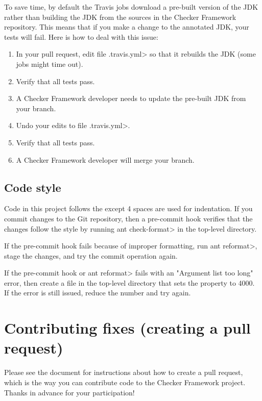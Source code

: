 To save time, by default the Travis jobs download a pre-built version of
the JDK rather than building the JDK from the sources in the Checker
Framework repository.  This means that if you make a change to the
annotated JDK, your tests will fail.  Here is how to deal with this issue:
\begin{enumerate}
\item
In your pull request, edit file \<.travis.yml> so that it rebuilds
the JDK (some jobs might time out).
\item Verify that all tests pass.
\item A Checker Framework developer needs to update the pre-built JDK from
  your branch.
\item
  Undo your edits to file \<.travis.yml>.
\item Verify that all tests pass.
\item A Checker Framework developer will merge your branch.
\end{enumerate}


\subsection{Code style\label{code-style}}

Code in this project follows the
 except 4 spaces are used for indentation.  If you commit changes to the
Git repository, then a pre-commit hook verifies that the changes follow the
style by running \<ant check-format> in the top-level directory.

If
the pre-commit hook fails
because of improper formatting, run \<ant reformat>, stage the
changes, and try the commit operation again.

If the pre-commit hook or \<ant reformat> fails with an
"Argument list too long" error, then create a  file
in the top-level directory that sets the property  to 4000.  If the error is still issued, reduce the number and
try again.


\section{Contributing fixes (creating a pull request)\label{pull-request}}

Please see the document
 for instructions about how to
create a pull request, which is the way you can contribute code to the
Checker Framework project.  Thanks in advance for your participation!


